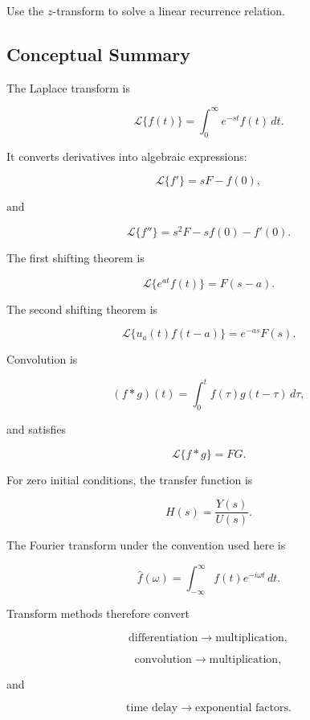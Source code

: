 \begin{exercise}[4]
Use the \(z\)-transform to solve a linear recurrence relation.
\end{exercise}

\subsection{Conceptual Summary}
\label{subsec:transform-method-summary}

The Laplace transform is

\[
\boxed{
\mathcal{L}\{f(t)\}
=
\int_0^\infty
e^{-st}f(t)\,dt.
}
\]

It converts derivatives into algebraic expressions:

\[
\boxed{
\mathcal{L}\{f'\}
=
sF-f(0),
}
\]

and

\[
\boxed{
\mathcal{L}\{f''\}
=
s^2F
-
sf(0)
-
f'(0).
}
\]

The first shifting theorem is

\[
\boxed{
\mathcal{L}
\{
e^{at}f(t)
\}
=
F(s-a).
}
\]

The second shifting theorem is

\[
\boxed{
\mathcal{L}
\{
u_a(t)f(t-a)
\}
=
e^{-as}F(s).
}
\]

Convolution is

\[
\boxed{
(f*g)(t)
=
\int_0^t
f(\tau)g(t-\tau)\,d\tau,
}
\]

and satisfies

\[
\boxed{
\mathcal{L}\{f*g\}
=
FG.
}
\]

For zero initial conditions, the transfer function is

\[
\boxed{
H(s)
=
\frac{
Y(s)
}{
U(s)
}.
}
\]

The Fourier transform under the convention used here is

\[
\boxed{
\widehat{f}(\omega)
=
\int_{-\infty}^{\infty}
f(t)e^{-i\omega t}\,dt.
}
\]

Transform methods therefore convert

\[
\boxed{
\text{differentiation}
\rightarrow
\text{multiplication},
}
\]

\[
\boxed{
\text{convolution}
\rightarrow
\text{multiplication},
}
\]

and

\[
\boxed{
\text{time delay}
\rightarrow
\text{exponential factors}.
}
\]

